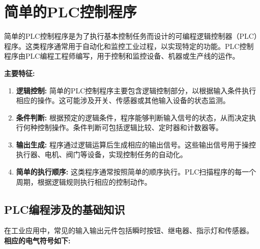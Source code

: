 \documentclass{book}
\begin{document}
	\chapter{简单的PLC控制程序}
 简单的PLC控制程序是为了执行基本控制任务而设计的可编程逻辑控制器（PLC）程序。这类程序通常用于自动化和监控工业过程，以实现特定的功能。PLC控制程序由PLC编程工程师编写，用于控制和监控设备、机器或生产线的运作。
	
	\textbf{主要特征:}
	\begin{enumerate}[label=--]
		\item \textbf{逻辑控制:} 简单的PLC控制程序主要包含逻辑控制部分，以根据输入条件执行相应的操作。这可能涉及开关、传感器或其他输入设备的状态监测。
		
		\item \textbf{条件判断:} 根据预定的逻辑条件，程序能够判断输入信号的状态，从而决定执行何种控制操作。条件判断可包括逻辑比较、定时器和计数器等。
		
		\item \textbf{输出生成:} 程序通过逻辑运算后生成相应的输出信号。这些输出信号用于操控执行器、电机、阀门等设备，实现控制任务的自动化。
		
		\item \textbf{简单的执行顺序:} 这类程序通常按照简单的顺序执行。PLC扫描程序的每一个周期，根据逻辑规则执行相应的控制动作。
	\end{enumerate}
	
 
	
	\newpage %
	
	\section{PLC编程涉及的基础知识} 
	在工业应用中，常见的输入输出元件包括瞬时按钮、继电器、指示灯和传感器。
	\textbf{相应的电气符号如下:}
\end{document}
